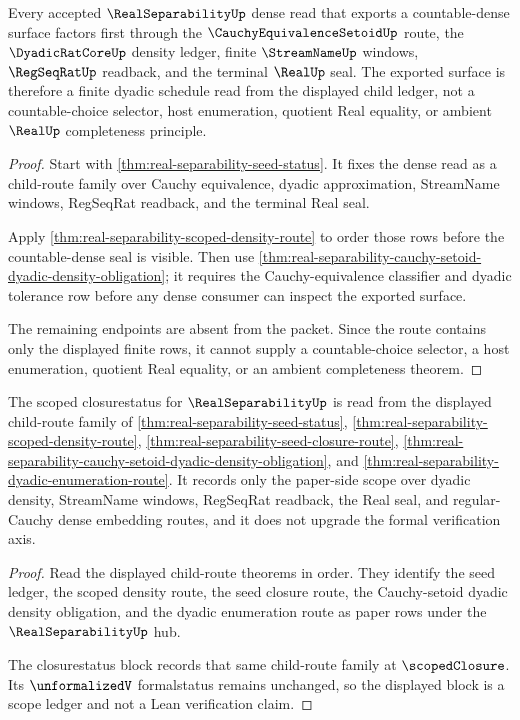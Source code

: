 \begin{theorem}
\label{thm:real-separability-dyadic-enumeration-route}
Every accepted $\RealSeparabilityUp$ dense read that exports a countable-dense surface factors first through the $\CauchyEquivalenceSetoidUp$ route, the $\DyadicRatCoreUp$ density ledger, finite $\StreamNameUp$ windows, $\RegSeqRatUp$ readback, and the terminal $\RealUp$ seal. The exported surface is therefore a finite dyadic schedule read from the displayed child ledger, not a countable-choice selector, host enumeration, quotient Real equality, or ambient $\RealUp$ completeness principle.
\end{theorem}
\begin{proof}
Start with \autoref{thm:real-separability-seed-status}. It fixes the dense read as a child-route family over Cauchy equivalence, dyadic approximation, StreamName windows, RegSeqRat readback, and the terminal Real seal.

Apply \autoref{thm:real-separability-scoped-density-route} to order those rows before the countable-dense seal is visible. Then use \autoref{thm:real-separability-cauchy-setoid-dyadic-density-obligation}; it requires the Cauchy-equivalence classifier and dyadic tolerance row before any dense consumer can inspect the exported surface.

The remaining endpoints are absent from the packet. Since the route contains only the displayed finite rows, it cannot supply a countable-choice selector, a host enumeration, quotient Real equality, or an ambient completeness theorem.
\end{proof}

\begin{theorem}
\label{thm:real-separability-seed-closure-status-block}
The scoped closurestatus for $\RealSeparabilityUp$ is read from the displayed child-route family of \autoref{thm:real-separability-seed-status}, \autoref{thm:real-separability-scoped-density-route}, \autoref{thm:real-separability-seed-closure-route}, \autoref{thm:real-separability-cauchy-setoid-dyadic-density-obligation}, and \autoref{thm:real-separability-dyadic-enumeration-route}. It records only the paper-side scope over dyadic density, StreamName windows, RegSeqRat readback, the Real seal, and regular-Cauchy dense embedding routes, and it does not upgrade the formal verification axis.
\end{theorem}
\begin{proof}
Read the displayed child-route theorems in order. They identify the seed ledger, the scoped density route, the seed closure route, the Cauchy-setoid dyadic density obligation, and the dyadic enumeration route as paper rows under the $\RealSeparabilityUp$ hub.

The closurestatus block records that same child-route family at $\scopedClosure$. Its $\unformalizedV$ formalstatus remains unchanged, so the displayed block is a scope ledger and not a Lean verification claim.
\end{proof}

